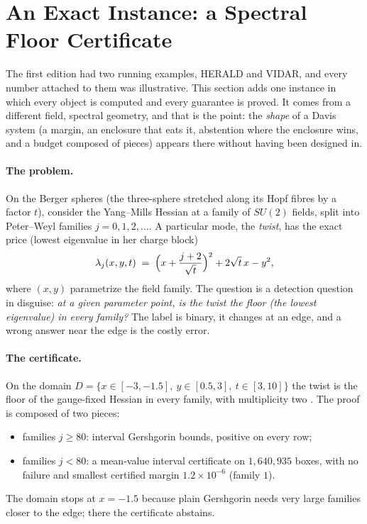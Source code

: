 \documentclass[11pt]{article}
\theoremstyle{remark}
\theoremstyle{plain}
\begin{document}
\section{An Exact Instance: a Spectral Floor Certificate}
\label{sec:exact-instance}

The first edition had two running examples, HERALD and VIDAR, and every number attached to them was
illustrative. This section adds one instance in which every object is computed and every guarantee is
proved. It comes from a different field, spectral geometry, and that is the point: the \emph{shape} of a Davis
system (a margin, an enclosure that eats it, abstention where the enclosure wins, and a budget composed of
pieces) appears there without having been designed in.

\paragraph{The problem.}
On the Berger spheres (the three-sphere stretched along its Hopf fibres by a factor $t$), consider the
Yang--Mills Hessian at a family of $SU(2)$ fields, split into Peter--Weyl families $j = 0,1,2,\dots$. A
particular mode, the \emph{twist}, has the exact price (lowest eigenvalue in her charge block)
\[
\lambda_j(x,y,t) \;=\; \Bigl(x + \frac{j+2}{\sqrt t}\Bigr)^2 + 2\sqrt t\,x - y^2 ,
\]
where $(x,y)$ parametrize the field family. The question is a detection question in disguise: \emph{at a given
parameter point, is the twist the floor (the lowest eigenvalue) in every family?} The label is binary, it changes
at an edge, and a wrong answer near the edge is the costly error.

\paragraph{The certificate.}
On the domain $D = \{x\in[-3,-1.5],\ y\in[0.5,3],\ t\in[3,10]\}$ the twist is the floor of the gauge-fixed Hessian
in every family, with multiplicity two \cite{davis2026floor,exactedge2026}. The proof is composed of two pieces:
\begin{itemize}
  \item families $j \ge 80$: interval Gershgorin bounds, positive on every row;
  \item families $j < 80$: a mean-value interval certificate on $1{,}640{,}935$ boxes, with no failure and smallest
    certified margin $1.2\times10^{-6}$ (family $1$).
\end{itemize}
The domain stops at $x = -1.5$ because plain Gershgorin needs very large families closer to the edge; there the
certificate abstains.
\end{document}
